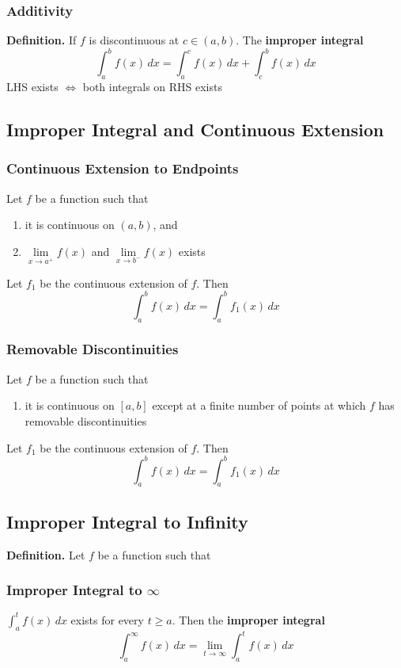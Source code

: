 \documentclass[../ma2002_notes.tex]{subfiles}
\begin{document}
\subsubsection{Additivity}
\textbf{Definition.} If \(f\) is discontinuous at \(c\in(a,b)\). The \textbf{improper integral}
\[\int_a^bf(x)\,dx=\int_a^cf(x)\,dx+\int_c^bf(x)\,dx\]
LHS exists \(\iff\) both integrals on RHS exists

\subsection{Improper Integral and Continuous Extension}
\subsubsection{Continuous Extension to Endpoints}
Let \(f\) be a function such that
\begin{enumerate}
	\item it is continuous on \((a,b)\), and
	\item\(\lim\limits_{x\to a^+}f(x)\) and \(\lim\limits_{x\to b^-}f(x)\) exists
\end{enumerate}
Let \(f_1\) be the continuous extension of \(f\). Then
\[\int_a^bf(x)\,dx=\int_a^bf_1(x)\,dx\]

\subsubsection{Removable Discontinuities}
Let \(f\) be a function such that
\begin{enumerate}
	\item it is continuous on \([a,b]\) except at a finite number of points at which \(f\) has removable discontinuities
\end{enumerate}
Let \(f_1\) be the continuous extension of \(f\). Then
\[\int_a^bf(x)\,dx=\int_a^bf_1(x)\,dx\]

\subsection{Improper Integral to Infinity}
\textbf{Definition.} Let \(f\) be a function such that
\subsubsection{Improper Integral to $\infty$}
\(\int_a^tf(x)\,dx\) exists for every \(t\geq a\). Then the \textbf{improper integral}
\[\int_a^\infty f(x)\,dx=\lim\limits_{t\to\infty}\int_a^tf(x)\,dx\]
\end{document}
